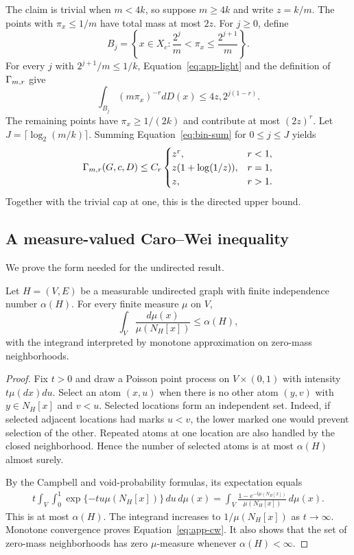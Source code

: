 The claim is trivial when $m<4k$, so suppose $m\geq4k$ and write $z=k/m$. The points with $\pi_x\leq1/m$ have total mass at most $2z$. For $j\geq0$, define
\[
B_j=\left\{x\in X_c:\frac{2^j}{m}<\pi_x\leq\frac{2^{j+1}}m\right\}.
\]
For every $j$ with $2^{j+1}/m\leq1/k$, Equation~\eqref{eq:app-light} and the definition of $\Gamma_{m,r}$ give
\begin{equation}
\int_{B_j}(m\pi_x)^{-r}dD(x)
\leq 4z,2^{j(1-r)}. \label{eq:bin-sum}
\end{equation}
The remaining points have $\pi_x\geq1/(2k)$ and contribute at most $(2z)^r$. Let $J=\lceil\log_2(m/k)\rceil$. Summing Equation~\eqref{eq:bin-sum} for $0\leq j\leq J$ yields
\[
\Gamma_{m,r}(G,c,D)\leq C_r
\begin{cases}
z^r,&r<1,\\
z(1+\log(1/z)),&r=1,\\
z,&r>1.
\end{cases}
\]
Together with the trivial cap at one, this is the directed upper bound.

\subsection{A measure-valued Caro--Wei inequality}

We prove the form needed for the undirected result.

\begin{lemma}
\label{lem:weighted-cw}
Let $H=(V,E)$ be a measurable undirected graph with finite independence number $\alpha(H)$. For every finite measure $\mu$ on $V$,
\begin{equation}
\int_V\frac{d\mu(x)}{\mu(N_H[x])}\leq\alpha(H), \label{eq:app-cw}
\end{equation}
with the integrand interpreted by monotone approximation on zero-mass neighborhoods.
\end{lemma}

\begin{proof}
Fix $t>0$ and draw a Poisson point process on $V\times(0,1)$ with intensity $t\mu(dx)du$. Select an atom $(x,u)$ when there is no other atom $(y,v)$ with $y\in N_H[x]$ and $v<u$. Selected locations form an independent set. Indeed, if selected adjacent locations had marks $u<v$, the lower marked one would prevent selection of the other. Repeated atoms at one location are also handled by the closed neighborhood. Hence the number of selected atoms is at most $\alpha(H)$ almost surely.

By the Campbell and void-probability formulas, its expectation equals
\begin{align*}
t\int_V\int_0^1\exp\{-tu\mu(N_H[x])\}\,du\,d\mu(x)
=\int_V\frac{1-e^{-t\mu(N_H[x])}}{\mu(N_H[x])}\,d\mu(x).
\end{align*}
This is at most $\alpha(H)$. The integrand increases to $1/\mu(N_H[x])$ as $t\to\infty$. Monotone convergence proves Equation~\eqref{eq:app-cw}. It also shows that the set of zero-mass neighborhoods has zero $\mu$-measure whenever $\alpha(H)<\infty$.
\end{proof}

